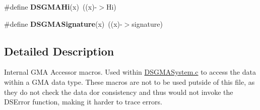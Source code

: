\begin{DoxyCompactItemize}
\item 
\hypertarget{group___d_s_g_m_a_a_c_c_e_s_s_o_r_s_gad8cf086cbd253602f9ff9d49ba12f0d0}{
\#define {\bfseries DSGMAHi}(x)~((x)-\/$>$Hi)}
\label{group___d_s_g_m_a_a_c_c_e_s_s_o_r_s_gad8cf086cbd253602f9ff9d49ba12f0d0}

\item 
\hypertarget{group___d_s_g_m_a_a_c_c_e_s_s_o_r_s_gaf2a003c9d0cc443cb9dd89e1e722b6bb}{
\#define {\bfseries DSGMASignature}(x)~((x)-\/$>$signature)}
\label{group___d_s_g_m_a_a_c_c_e_s_s_o_r_s_gaf2a003c9d0cc443cb9dd89e1e722b6bb}

\end{DoxyCompactItemize}


\subsection{Detailed Description}
Internal GMA Accessor macros. Used within \hyperlink{_d_s_g_m_a_system_8c}{DSGMASystem.c} to access the data within a GMA data type. These macros are not to be used putside of this file, as they do not check the data dor consistency and thus would not invoke the DSError function, making it harder to trace errors. 